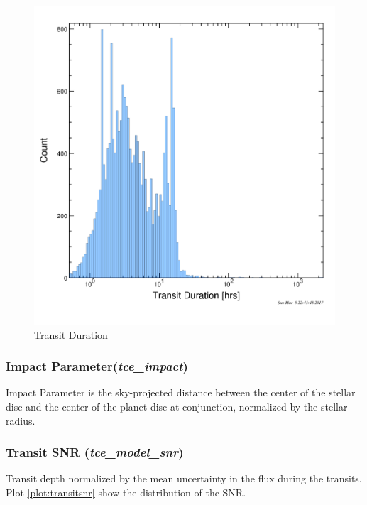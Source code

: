 \begin{figure}[!h]
\begin{center}
        \includegraphics[width=0.5\textheight]{img/transitduration.png}
        \caption{Transit Duration}  \label{plot:transitduration}
\end{center}
\end{figure}

\subsubsection{Impact Parameter(\emph{tce\_impact})}
Impact Parameter is the sky-projected distance between the center of the stellar disc and the center of the planet disc at conjunction, normalized by the stellar radius.

\subsubsection{Transit SNR (\emph{tce\_model\_snr})}
Transit depth normalized by the mean uncertainty in the flux during the transits. Plot \ref{plot:transitsnr} show the distribution of the SNR. 

